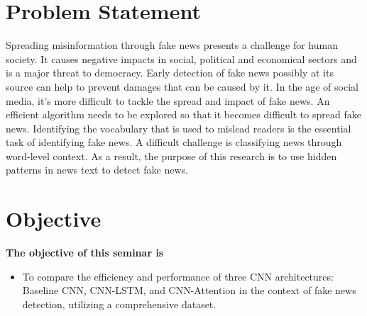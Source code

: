 \section{Problem Statement}

Spreading misinformation through fake news presents a challenge for human society. It causes negative impacts in social, political and economical sectors and is a major threat to democracy. Early detection of fake news possibly at its source can help to prevent damages that can be caused by it. In the age of social media, it's more difficult to tackle the spread and impact of fake news. An efficient algorithm needs to be explored so that it becomes difficult to spread fake news. Identifying the vocabulary that is used to mislead readers is the essential task of identifying fake news. A difficult challenge is classifying news through word-level context. As a result, the purpose of this research is to use hidden patterns in news text to detect fake news.

\section{Objective}

\textbf{The objective of this seminar is}
\begin{itemize}
    \item To compare the efficiency and performance of three CNN architectures: Baseline CNN, CNN-LSTM, and CNN-Attention in the context of fake news detection, utilizing a comprehensive dataset.
\end{itemize}

\clearpage